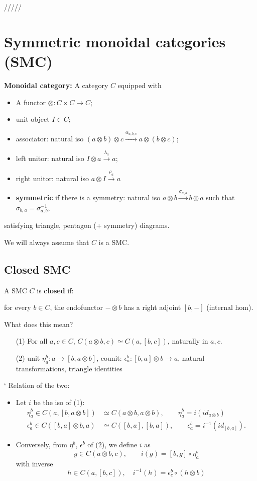 \documentclass[12pt]{article}
\theoremstyle{definition}
\theoremstyle{remark}
\begin{document}
/////


\section{Symmetric monoidal categories (SMC)}

 \textbf{Monoidal category:} A category $C$ equipped with
\begin{itemize}
\item A functor $\otimes: C\times C\to C$;
\item unit object $I\in C$;
\item associator: natural iso $(a\otimes b)\otimes c \xrightarrow{\alpha_{a,b,c}} a\otimes
(b\otimes c)$;
\item left unitor: natural iso $I\otimes a \xrightarrow{\lambda_a} a$;


\item right unitor: natural iso $a\otimes I \xrightarrow{\rho_a} a$

\item \textbf{symmetric} if there is a symmetry: natural iso $a\otimes
b\xrightarrow{\sigma_{a,b}} b\otimes a$ such that $\sigma_{b,a}=\sigma_{a,b}^{-1}$, 

\end{itemize}
satisfying triangle, pentagon (+ symmetry) diagrams.

\medskip

We will always assume that $C$ is a SMC.


\subsection{Closed SMC}

A SMC $C$ is \textbf{closed} if:

\medskip %
for every $b\in C$, the endofunctor $-\otimes b$ has a
right adjoint $[b,-]$ (internal hom). 

\medskip
\noindent
What does this mean?

\begin{enumerate}
\item[(1)] For all $a,c\in C$, $C(a\otimes b,c)\simeq C(a,[b,c])$, naturally in $a,c$.
\item[(2)] unit $\eta^b_a: a\to [b,a\otimes b]$, counit: $\epsilon^b_a: [b,a]\otimes
b\to a$, natural transformations, triangle identities
\end{enumerate}
`
Relation of the two: 
\begin{itemize}
\item Let $i$ be the iso of (1): 
\begin{align*}
\eta^b_a\in C(a,[b,a\otimes b])&\simeq C(a\otimes b,a\otimes b),\qquad
\eta^b_a=i(id_{a\otimes b})\\
\epsilon^b_a\in C([b,a]\otimes b,a)&\simeq C([b,a],[b,a]),\qquad \epsilon^b_a=i^{-1}(id_{[b,a]}).
\end{align*}
\item Conversely, from $\eta^b$, $\epsilon^b$ of (2), we define $i$ as 
\[
g\in C(a\otimes b,c),\qquad i(g)=[b,g]\circ \eta^b_a
\]
with inverse
\[
h\in C(a,[b,c]),\quad i^{-1}(h)=\epsilon^b_c\circ (h\otimes b)
\]

\end{itemize}
\end{document}
